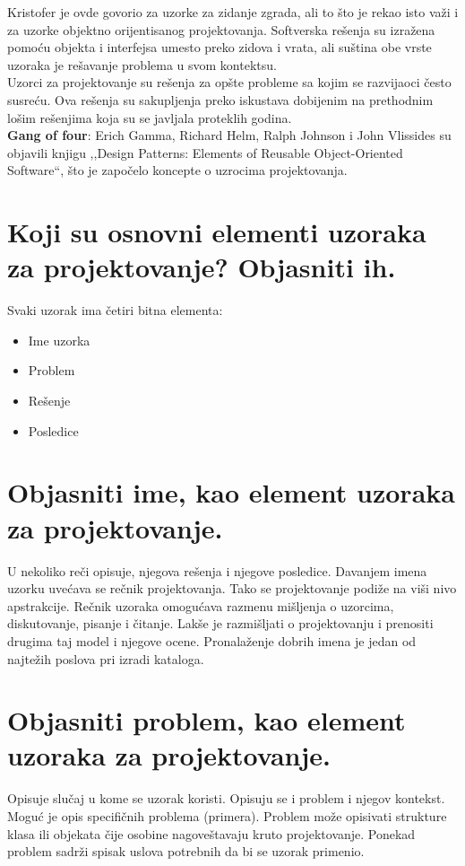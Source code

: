 \documentclass[a4paper]{article}
\begin{document}
  Kristofer je ovde govorio za uzorke za zidanje zgrada, ali to što je rekao isto važi i za
  uzorke objektno orijentisanog projektovanja. Softverska rešenja su izražena pomoću objekta i 
  interfejsa umesto preko zidova i vrata, ali suština obe vrste uzoraka je rešavanje problema
  u svom kontektsu.\\
  \indent Uzorci za projektovanje su rešenja za opšte probleme sa kojim se razvijaoci često susreću.
  Ova rešenja su sakupljenja preko iskustava dobijenim na prethodnim lošim rešenjima koja su
  se javljala proteklih godina.\\
  \indent \textbf{Gang of four}: Erich Gamma, Richard Helm, Ralph Johnson i John Vlissides su objavili
  knjigu ,,Design Patterns: Elements of Reusable Object-Oriented Software``, što je započelo 
  koncepte o uzrocima projektovanja.

\section{Koji su osnovni elementi uzoraka za projektovanje? Objasniti ih.}
  \noindent Svaki uzorak ima četiri bitna elementa:
  \begin{itemize}
    \item Ime uzorka
    \item Problem
    \item Rešenje
    \item Posledice
  \end{itemize}

\section{Objasniti ime, kao element uzoraka za projektovanje.}
  U nekoliko reči opisuje, njegova rešenja i njegove posledice.
  Davanjem imena uzorku uvećava se rečnik projektovanja.
  Tako se projektovanje podiže na viši nivo apstrakcije.
  Rečnik uzoraka omogućava razmenu mišljenja o uzorcima, diskutovanje, pisanje i čitanje.
  Lakše je razmišljati o projektovanju i prenositi drugima taj model i njegove ocene.
  Pronalaženje dobrih imena je jedan od najtežih poslova pri izradi kataloga.

\section{Objasniti problem, kao element uzoraka za projektovanje.}
  Opisuje slučaj u kome se uzorak koristi.
  Opisuju se i problem i njegov kontekst.
  Moguć je opis specifičnih problema (primera).
  Problem može opisivati strukture klasa ili objekata čije osobine nagoveštavaju kruto 
  projektovanje. Ponekad problem sadrži spisak uslova potrebnih da bi se uzorak primenio.
\end{document}
